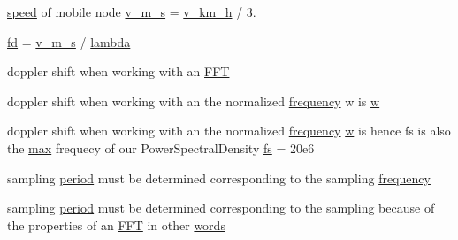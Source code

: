 \begin{DoxyCompactItemize}
\item 
\hyperlink{mmwave-amc-test_8cc_a6dc6e6f3c75c509ce943163afb5dade7}{speed} of mobile node \hyperlink{mmwave_2model_2fading-traces_2fading__trace__generator_8m_a59f0e4250bcce6edcd617a29fd06e564}{v\+\_\+m\+\_\+s} = \hyperlink{mmwave_2model_2fading-traces_2fading__trace__generator_8m_ae7f804d3a4530aaf512fd8c59271cfd2}{v\+\_\+km\+\_\+h} / 3.
\item 
\hyperlink{mmwave_2model_2fading-traces_2fading__trace__generator_8m_a44f21d5190b5a6df8089f54799628d7e}{fd} = \hyperlink{mmwave_2model_2fading-traces_2fading__trace__generator_8m_a59f0e4250bcce6edcd617a29fd06e564}{v\+\_\+m\+\_\+s} / \hyperlink{loss__ITU1411__NLOS__over__rooftop_8m_aca36b09d6e71a60cfa3837d7e24c07ca}{lambda}
\item 
doppler shift when working with an \hyperlink{mmwave_2model_2fading-traces_2fading__trace__generator_8m_ac4962f4e70dbd9d6f4994fd9698b6932}{F\+FT}
\item 
doppler shift when working with an the normalized \hyperlink{mmwave_2model_2fading-traces_2fading__trace__generator_8m_a09045328d6d7e16aa4013f526cc6993d}{frequency} w is \hyperlink{mmwave_2model_2fading-traces_2fading__trace__generator_8m_afd61ec66f9d7b807eece6eb12c781844}{w}
\item 
doppler shift when working with an the normalized \hyperlink{mmwave_2model_2fading-traces_2fading__trace__generator_8m_a09045328d6d7e16aa4013f526cc6993d}{frequency} \hyperlink{mmwave_2model_2fading-traces_2fading__trace__generator_8m_afd61ec66f9d7b807eece6eb12c781844}{w} is hence fs is also the \hyperlink{80211b_8c_affe776513b24d84b39af8ab0930fef7f}{max} frequecy of our Power\+Spectral\+Density \hyperlink{mmwave_2model_2fading-traces_2fading__trace__generator_8m_a9eba99c13508cc57a010f196f60992ff}{fs} = 20e6
\item 
sampling \hyperlink{mmwave_2model_2fading-traces_2fading__trace__generator_8m_ae10c944bf9f3fba2686a5885ecc192d7}{period} must be determined corresponding to the sampling \hyperlink{mmwave_2model_2fading-traces_2fading__trace__generator_8m_a09045328d6d7e16aa4013f526cc6993d}{frequency}
\item 
sampling \hyperlink{mmwave_2model_2fading-traces_2fading__trace__generator_8m_ae10c944bf9f3fba2686a5885ecc192d7}{period} must be determined corresponding to the sampling because of the properties of an \hyperlink{mmwave_2model_2fading-traces_2fading__trace__generator_8m_ac4962f4e70dbd9d6f4994fd9698b6932}{F\+FT} in other \hyperlink{mmwave_2model_2fading-traces_2fading__trace__generator_8m_af9a26b3e340bad66623028824688ed22}{words}

\end{DoxyCompactItemize}
